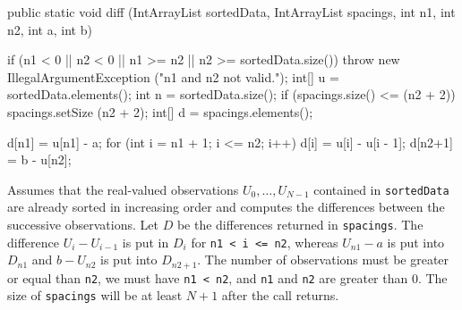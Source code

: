 \begin{htmlonly}
\end{htmlonly}
\begin{code}

   public static void diff (IntArrayList sortedData, IntArrayList spacings,
                            int n1, int n2, int a, int b)\begin{hide} {
      if (n1 < 0 || n2 < 0 || n1 >= n2 || n2 >= sortedData.size())
         throw new IllegalArgumentException ("n1 and n2 not valid.");
      int[] u = sortedData.elements();
      int n = sortedData.size();
      if (spacings.size() <= (n2 + 2))
         spacings.setSize (n2 + 2);
      int[] d = spacings.elements();

      d[n1] = u[n1] - a;
      for (int i = n1 + 1; i <= n2; i++)
         d[i] = u[i] - u[i - 1];
      d[n2+1] = b - u[n2];
   }\end{hide}
\end{code}
 \begin{tabb} Assumes that the real-valued observations $U_0,\dots,U_{N-1}$
  contained in \texttt{sortedData}
  are already sorted in increasing order and computes the differences
  between the successive observations. Let $D$ be the differences
  returned in \texttt{spacings}.
  The difference $U_i - U_{i-1}$ is put in $D_i$ for
  \texttt{n1 < i <= n2}, whereas $U_{n1} - a$ is put into $D_{n1}$
  and $b - U_{n2}$ is put into $D_{n2+1}$.
%
  The number of observations must be greater or equal than \texttt{n2}, we
  must have
  \texttt{n1 < n2}, and \texttt{n1} and \texttt{n2} are greater than 0.
  The size of \texttt{spacings} will be at least $N+1$ after
  the call returns.
 \end{tabb}
\begin{htmlonly}
\end{htmlonly}
